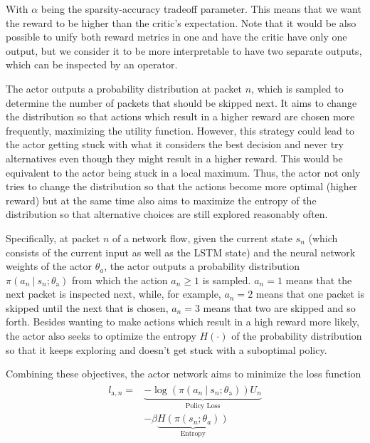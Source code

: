 \documentclass[conference]{IEEEtran}
\newcommand\givenbase[1][]{\:#1\lvert\:}
\let\given\givenbase
\begin{document}
With $\alpha$ being the sparsity-accuracy tradeoff parameter. This means that we want the reward to be higher than the critic's expectation. Note that it would be also possible to unify both reward metrics in one and have the critic have only one output, but we consider it to be more interpretable to have two separate outputs, which can be inspected by an operator.

The actor outputs a probability distribution at packet $n$, which is sampled to determine the number of packets that should be skipped next. It aims to change the distribution so that actions which result in a higher reward are chosen more frequently, maximizing the utility function. However, this strategy could lead to the actor getting stuck with what it considers the best decision and never try alternatives even though they might result in a higher reward. This would be equivalent to the actor being stuck in a local maximum. Thus, the actor not only tries to change the distribution so that the actions become more optimal (higher reward) but at the same time also aims to maximize the entropy of the distribution so that alternative choices are still explored reasonably often.

Specifically, at packet $n$ of a network flow, given the current state $s_n$ (which consists of the current input as well as the LSTM state) and the neural network weights of the actor $\theta_a$, the actor outputs a probability distribution $\pi \left( a_n \given s_n ; \theta_\text{a} \right)$ from which the action $a_n \ge 1$ is sampled. $a_n=1$ means that the next packet is inspected next, while, for example, $a_n=2$ means that one packet is skipped until the next that is chosen, $a_n = 3$ means that two are skipped and so forth. Besides wanting to make actions which result in a high reward more likely, the actor also seeks to optimize the entropy $H(\cdot)$ of the probability distribution so that it keeps exploring and doesn't get stuck with a suboptimal policy.

Combining these objectives, the actor network aims to minimize the loss function
\begin{align}
\begin{split}
l_{\text{a},n} =& \underbrace{ -\log \left( \pi \left( a_n \given s_n ; \theta_\text{a} \right) \right) U_n}_{\text{Policy Loss}} \\
&- \beta \underbrace{H\left( \pi\left( s_n; \theta_a \right)\right) }_{\text{Entropy}}
\end{split}\label{eq:actor}
\end{align}
\end{document}

